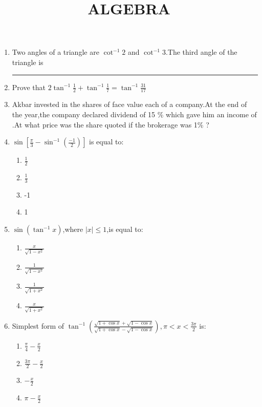 \documentclass{article}
\newcommand{\sbrak}{\textbf{}}
\providecommand{\abs}[1]{\left\vert#1\right\vert}
\begin{document}
\title{\textbf{ALGEBRA}}
\date{}
\maketitle

\begin{enumerate}
\item Two angles of a triangle are  $\cot^{-1}2$ and $\cot^{-1}3$.The third angle of the
triangle is \rule{30pt}{1pt}

\item Prove that $2\tan^{-1}\frac{1}{2} + \tan^{-1}\frac{1}{7} = \tan^{-1}\frac{31}{17}$

\item Akbar invested  in the shares of face value  each of a company.At the end of the year,the company declared dividend of 15 \% which gave him an income of .At what price was the share quoted if the brokerage was 1\% ?

\item $ \sin \sbrak[\frac{\pi}{3}-\sin^{-1}(\frac{-1}{2})] $ is equal to:

\begin{enumerate}

 \item $\frac{1}{2}$
 \item $\frac{1}{3}$
 \item -1
 \item 1

\end{enumerate}

\item $ \sin(\tan^{-1}x)$,where $\abs{x} \le 1 $,is equal to:

\begin{enumerate}

	\item$\frac{x}{\sqrt{1-x^2}}$
	\item$\frac{1}{\sqrt{1-x^2}}$ 
	\item$\frac{1}{\sqrt{1+x^2}}$
	\item$\frac{x}{\sqrt{1+x^2}}$

\end{enumerate}  

\item Simplest form of $ \tan^{-1}(\frac{\sqrt{1+\cos x}+\sqrt{1-\cos x}}{\sqrt{1+\cos x}- \sqrt {1- \cos x}}) , \pi < x < \frac{3\pi}{2}$ is:

\begin{enumerate}

  \item$\frac{\pi}{4} - \frac{x}{2}$
  \item$\frac{3\pi}{2} - \frac{x}{2}$
  \item$-\frac{x}{2}$
  \item${\pi} - \frac{x}{2}$

\end{enumerate}
\end{enumerate}
\end{document}
